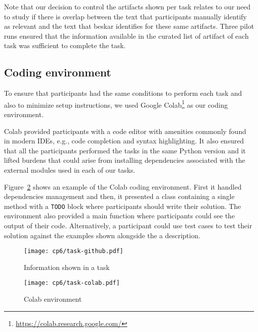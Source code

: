 Note that our decision to control the artifacts shown per task relates to our need to study if there is overlap between the text that participants manually identify as relevant and the text that \acs{beskar} identifies for these same artifacts. 
Three pilot runs ensured that the information available in the curated list of artifact of each task was sufficient to complete the task. 


\subsection{Coding environment}
\label{cp6:coding-environment}



To ensure that participants had the same conditions to perform each task
and also to minimize setup instructions, we used Google Colab\footnote{\url{https://colab.research.google.com/}} as our coding environment. 


Colab provided participants with a code editor with amenities commonly found in modern IDEs, e.g., code completion and syntax highlighting. It also ensured that all the participants 
performed the tasks in the same Python version and it lifted 
burdens that could arise from installing dependencies associated with the external modules used in each of our tasks. 


Figure~\ref{fig:nytimes-task-colab} shows an example of the Colab coding environment. 
First it handled dependencies management and then, 
it presented a class containing a single method with a \texttt{TODO} block where 
participants should write their solution. 
The environment also provided a main function where participants could see the output
of their code. Alternatively, a participant could use test cases to test their solution
against the examples shown alongside the a description.



\clearpage

\begin{figure}
    \centering
    \texttt{[image: cp6/task-github.pdf]}
    \caption{Information shown in a task}
    \label{fig:nytimes-task-github}
\end{figure}



\clearpage

\begin{figure}
    \centering
    \texttt{[image: cp6/task-colab.pdf]}
    \caption{Colab environment}
    \label{fig:nytimes-task-colab}
\end{figure}



